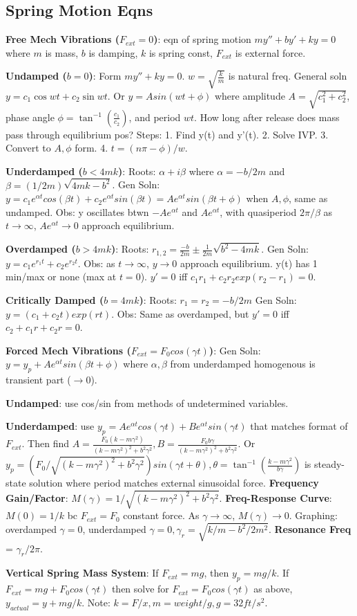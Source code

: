 \subsection*{Spring Motion Eqns}

\textbf{Free Mech Vibrations ($F_{ext} = 0$)}:
eqn of spring motion $my'' + by' + ky = 0$ where $m$ is mass, $b$ is damping, $k$ is spring const, $F_{ext}$ is external force.

\textbf{Undamped ($b=0$)}:
Form $my'' + ky = 0$. $w = \sqrt{\frac{k}{m}}$ is natural freq. General soln $y = c_1 \cos{wt} + c_2 \sin{wt}$. 
Or $y = Asin(wt + \phi)$ where amplitude $A = \sqrt{c_1^2 + c_2^2}$, phase angle $\phi = \tan^{-1}(\frac{c_1}{c_2})$, and period $wt$. 
How long after release does mass pass through equilibrium pos? Steps: 
1. Find y(t) and y'(t). 2. Solve IVP. 3. Convert to $A, \phi$ form. 4. $t = (n \pi - \phi)/w$.

\textbf{Underdamped ($b < 4mk$)}:
Roots: $\alpha + i \beta$ where $\alpha = -b/2m$ and $\beta = (1/2m)\sqrt{4mk - b^2}$. 
Gen Soln: $y = c_1 e^{\alpha t} cos(\beta t) + c_2 e^{\alpha t} sin(\beta t) = Ae^{\alpha t}sin(\beta t + \phi)$ when $A, \phi$, same as undamped. 
Obs: y oscillates btwn $-Ae^{\alpha t}$ and $Ae^{\alpha t}$, with quasiperiod $2 \pi / \beta$ as $t \to \infty$, $Ae^{\alpha t} \to 0$ approach equilibrium. 

\textbf{Overdamped ($b > 4mk$)}:
Roots: $r_{1, 2} = \frac{-b}{2m} \pm \frac{1}{2m}\sqrt{b^2 - 4mk}$. 
Gen Soln: $y = c_1 e^{r_1 t} + c_2 e^{r_2 t}$. 
Obs: as $t \to \infty$, $y \to 0$ approach equilibrium. y(t) has 1 min/max or none (max at $t=0$). $y'=0$ iff $c_1r_1 + c_2r_2 exp(r_2-r_1) = 0$. 
 
\textbf{Critically Damped ($b = 4mk$)}:
Roots: $r_1 = r_2 = -b/2m$ 
Gen Soln: $y = (c_1 + c_2t)exp(rt)$.
Obs: Same as overdamped, but $y'=0$ iff $c_2 + c_1r + c_2r = 0$.

\textbf{Forced Mech Vibrations ($F_{ext} = F_0 cos(\gamma t)$)}:
Gen Soln: $y = y_p + Ae^{\alpha t}sin(\beta t + \phi)$ where $\alpha, \beta$ from underdamped homogenous is transient part ($\to 0$). 

\textbf{Undamped}: 
use cos/sin from methods of undetermined variables.

\textbf{Underdamped}:
use $y_p = Ae^{\alpha t}cos(\gamma t) + Be^{\alpha t}sin(\gamma t)$ that matches format of $F_{ext}$. 
Then find $A = \frac{F_0 (k-m\gamma^2)}{(k-m\gamma^2)^2 + b^2\gamma^2}, B = \frac{F_0 b \gamma}{(k-m\gamma^2)^2 + b^2\gamma^2}$. 
Or $y_p = (F_0/\sqrt{(k-m\gamma^2)^2 + b^2\gamma^2})sin(\gamma t + \theta), \theta = \tan^{-1}(\frac{k-m\gamma^2}{b\gamma})$ is steady-state solution 
where period matches external sinusoidal force. \textbf{Frequency Gain/Factor}: $M(\gamma) = 1/\sqrt{(k-m\gamma^2)^2 + b^2\gamma^2}$. 
\textbf{Freq-Response Curve}: $M(0) = 1/k$ bc $F_{ext} = F_0$ constant force. As $\gamma \to \infty$, $M(\gamma) \to 0$. Graphing: overdamped $\gamma = 0$, 
underdamped $\gamma=0, \gamma_r = \sqrt{k/m - b^2/2m^2}$. \textbf{Resonance Freq} = $\gamma_r/2\pi$. 

\textbf{Vertical Spring Mass System}: 
If $F_{ext}=mg$, then $y_p = mg/k$. If $F_{ext}=mg + F_0cos(\gamma t)$ then solve for $F_{ext} = F_0cos(\gamma t)$ as above, $y_{actual} = y + mg/k$. 
Note: $k = F/x, m = weight/g, g=32ft/s^2$.

